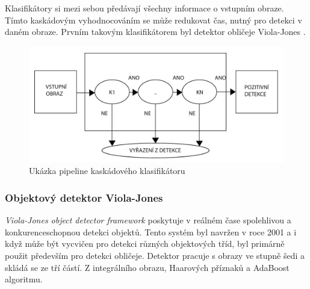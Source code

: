 Klasifikátory si mezi sebou předávají všechny informace o vstupním obraze. Tímto kaskádovým vyhodnocováním se může redukovat čas, nutný pro detekci v daném obraze. Prvním takovým klasifikátorem byl detektor obličeje Viola-Jones \cite{violajones}.  
\begin{figure}[H]
\centering
\includegraphics[width=.7\linewidth]{figures/cascadeClass.pdf}
\caption{Ukázka pipeline kaskádového klasifikátoru}
\label{fig:ccpipeline}
\end{figure}

\subsubsection{Objektový detektor Viola-Jones}
\textit{Viola-Jones object detector framework} poskytuje v reálném čase spolehlivou a konkurenceschopnou detekci objektů. Tento systém byl navržen v roce 2001 a i když může být vycvičen pro detekci různých objektových tříd, byl primárně použit především pro detekci obličeje. Detektor pracuje s obrazy ve stupně šedi a skládá se ze tří částí. Z integrálního obrazu, Haarových příznaků a AdaBoost algoritmu. 

